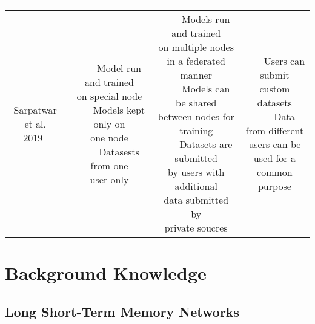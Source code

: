 \documentclass{article}
\newcommand{\tabitem}{~~\llap{\textbullet}~~}
\begin{document}
\begin{table}[H]
\begin{center}
\begin{tabular}{c|c|c|c}
{                }\\\hline
                \makecell[l]{Sarpatwar et al.\\2019~\cite{priceOfTrust}} &
                \makecell[l]{
                    \tabitem Model run and trained\\on special node\\
                    \tabitem Models kept only on\\one node\\
                    \tabitem Datasests from one\\user only\\
                } & \makecell[l]{
                    \tabitem Models run and trained\\on multiple nodes\\in a federated manner\\
                    \tabitem Models can be shared\\between nodes for training\\
                    \tabitem Datasets are submitted\\by users with additional\\data submitted by\\private soucres\\
                } & \makecell[l]{
                    \tabitem Users can submit\\custom datasets\\
                    \tabitem Data from different\\users can be used for a\\common purpose\\
                }\\\hline
            \end{tabular}
            \egroup
        \end{center}
    \end{table}

    \section{Background Knowledge}

    \subsection{Long Short-Term Memory Networks}
\end{document}
